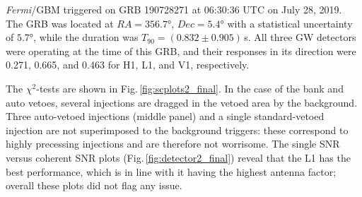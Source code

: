 \documentclass[binding=0.6cm, LaM]{sapthesis}
\begin{document}
        {\it Fermi}/GBM triggered on GRB 190728271 at 06:30:36 UTC on July 28, 2019.
        The GRB was located at $RA = \ang{356.7}$, $Dec = \ang{5.4}$
        with a statistical uncertainty of $\ang{5.7}$, while the duration was $T_{90} = (0.832 \pm 0.905)\,$s.
        All three GW detectors were operating at the time of this GRB,
        and their responses in its direction were 0.271, 0.665, and 0.463 for H1, L1, and V1, respectively.

	The $\chi^2$-tests are shown in Fig.\,\ref{fig:scplots2_final}.
        In the case of the bank and auto vetoes, several injections are dragged in the vetoed area by the background.  Three auto-vetoed injections (middle panel) and a single standard-vetoed injection are not superimposed to the background triggers: these correspond to highly precessing injections and are therefore not worrisome.
        The single SNR versus coherent SNR plots (Fig.\,\ref{fig:detector2_final}) reveal that 
	the L1 has the best performance, which is in line with it having the highest antenna factor; overall these plots did not flag any issue.
\end{document}
